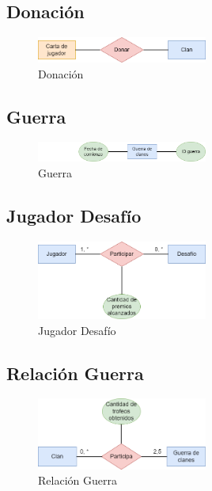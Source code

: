 \subsection*{Donación}
\begin{figure}[H]
\centering
\includegraphics[width=0.5\textwidth]{../images/merx_gift.png}
\caption{Donación}
\end{figure}

\subsection*{Guerra}
\begin{figure}[H]
\centering
\includegraphics[width=0.5\textwidth]{../images/merx_war.png}
\caption{Guerra}
\end{figure}

\subsection*{Jugador Desafío}
\begin{figure}[H]
\centering
\includegraphics[width=0.5\textwidth]{../images/merx_playerchallenge.png}
\caption{Jugador Desafío}
\end{figure}

\subsection*{Relación Guerra }
\begin{figure}[H]
\centering
\includegraphics[width=0.5\textwidth]{../images/merx_clanwar.png}
\caption{Relación Guerra}
\end{figure}
